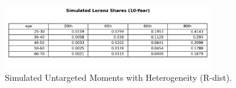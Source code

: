 \begin{figure}[htbp]
\centering
\includegraphics[width=0.8\textwidth]{Tables/Sim_Lorenz_10yr_LCrrDistNetWorth_2019.png}
\caption{Simulated Untargeted Moments with Heterogeneity (R-dist).}
\label{fig:SimLorenzTarDist2019}
\end{figure}
